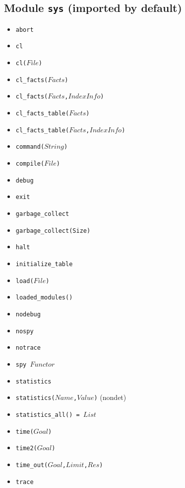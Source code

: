\documentclass[10pt]{article}
\begin{document}
\begin{multicols}{2}
\section*{Module \texttt{sys} (imported by default)}
\begin{scriptsize}
\begin{itemize}
    \item \texttt{abort}
    \item \texttt{cl}
    \item \texttt{cl($File$)}
    \item \texttt{cl\_facts($Facts$)}
    \item \texttt{cl\_facts($Facts$,$IndexInfo$)}    
    \item \texttt{cl\_facts\_table($Facts$)}
    \item \texttt{cl\_facts\_table($Facts$,$IndexInfo$)}
    \item \texttt{command($String$)}
    \item \texttt{compile($File$)}
    \item \texttt{debug}
    \item \texttt{exit} 
    \item \texttt{garbage\_collect} 
    \item \texttt{garbage\_collect(Size)} 
    \item \texttt{halt} 
    \item \texttt{initialize\_table}
    \item \texttt{load($File$)}
    \item \texttt{loaded\_modules()}
    \item \texttt{nodebug}
    \item \texttt{nospy}
    \item \texttt{notrace}
    \item \texttt{spy $Functor$}
    \item \texttt{statistics}
    \item \texttt{statistics($Name$,$Value$)} (nondet)
    \item \texttt{statistics\_all() = $List$}    
    \item \texttt{time($Goal$)}
    \item \texttt{time2($Goal$)} 
    \item \texttt{time\_out($Goal$,$Limit$,$Res$)}
    \item \texttt{trace}
\end{itemize}
\end{scriptsize}

\end{multicols}
\end{document}
